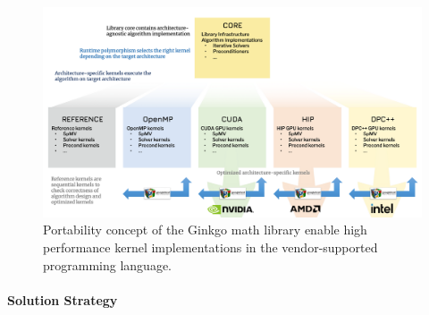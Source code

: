 \begin{figure}[!h]
\centering
\includegraphics[width=.8\columnwidth]{projects/2.3.3-MathLibs/2.3.3.13-CLOVER/ginkgo_portability_crop}
\caption{\label{fig:ginkgoportability}Portability concept of the Ginkgo math library enable high performance kernel implementations in the vendor-supported programming language.}
\end{figure}


\paragraph{Solution Strategy}

